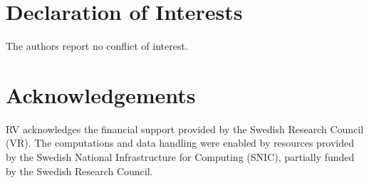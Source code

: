 


%  
%  
% 
%  
%  
% 

 
 

 
 



\section*{Declaration of Interests}
The authors report no conflict of interest.

\section*{Acknowledgements}
RV acknowledges the financial support provided by the Swedish Research Council (VR).
The computations and data handling were enabled by resources provided by the Swedish National Infrastructure for Computing (SNIC), partially funded by the Swedish Research Council.

\FloatBarrier



\appendix

\FloatBarrier
% 
% 



% 
